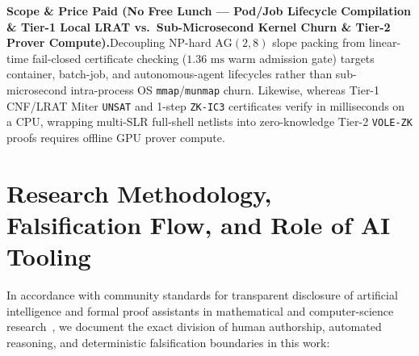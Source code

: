 \documentclass[11pt,letterpaper]{article}
\theoremstyle{spectralthm}
\begin{document}
\noindent\textbf{Scope \& Price Paid (No Free Lunch --- Pod/Job Lifecycle Compilation \& Tier-1 Local LRAT vs.\ Sub-Microsecond Kernel Churn \& Tier-2 Prover Compute).}\;Decoupling NP-hard $\mathrm{AG}(2,8)$ slope packing from linear-time fail-closed certificate checking ($1.36\text{~ms}$ warm admission gate) targets container, batch-job, and autonomous-agent lifecycles rather than sub-microsecond intra-process OS \texttt{mmap}/\texttt{munmap} churn. Likewise, whereas Tier-1 CNF/LRAT Miter \texttt{UNSAT} and 1-step \texttt{ZK-IC3} certificates verify in milliseconds on a CPU, wrapping multi-SLR full-shell netlists into zero-knowledge Tier-2 \texttt{VOLE-ZK} proofs requires offline GPU prover compute.

\section*{Research Methodology, Falsification Flow, and Role of AI Tooling}
In accordance with community standards for transparent disclosure of artificial intelligence and formal proof assistants in mathematical and computer-science research~\cite{tao2025machine, tao2026icm, leiden2026}, we document the exact division of human authorship, automated reasoning, and deterministic falsification boundaries in this work:
\end{document}
